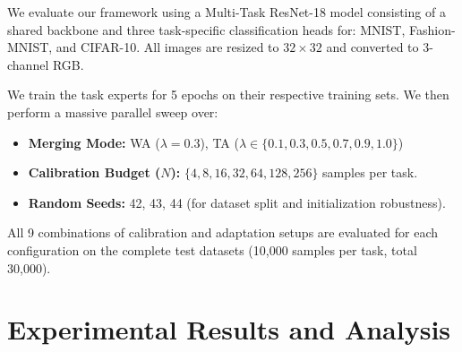 \documentclass{article}
\theoremstyle{plain}
\theoremstyle{definition}
\theoremstyle{remark}
\begin{document}
We evaluate our framework using a Multi-Task ResNet-18 model consisting of a shared backbone and three task-specific classification heads for: MNIST, Fashion-MNIST, and CIFAR-10. All images are resized to $32 \times 32$ and converted to 3-channel RGB.

We train the task experts for 5 epochs on their respective training sets. We then perform a massive parallel sweep over:
\begin{itemize}
    \item \textbf{Merging Mode:} WA ($\lambda = 0.3$), TA ($\lambda \in \{0.1, 0.3, 0.5, 0.7, 0.9, 1.0\}$)
    \item \textbf{Calibration Budget ($N$):} $\{4, 8, 16, 32, 64, 128, 256\}$ samples per task.
    \item \textbf{Random Seeds:} 42, 43, 44 (for dataset split and initialization robustness).
\end{itemize}
All 9 combinations of calibration and adaptation setups are evaluated for each configuration on the complete test datasets (10,000 samples per task, total 30,000).

\section{Experimental Results and Analysis}
\label{sec:results}
\end{document}
